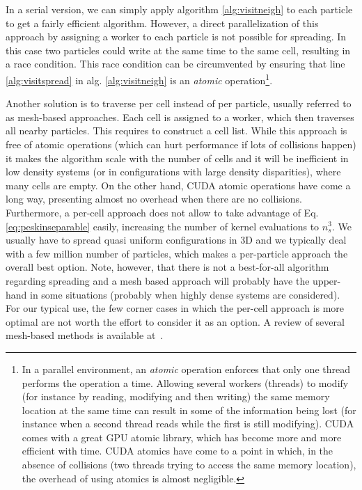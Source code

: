 \documentclass[twoside,openright,titlepage,numbers=noenddot,%
headinclude,footinclude,cleardoublepage=empty,abstract=on,
BCOR=5mm,fontsize=11pt, dvipsnames, paper=b5
]{scrreprt}
\begin{document}
In a serial version, we can simply apply algorithm \ref{alg:visitneigh} to each particle to get a fairly efficient algorithm. However, a direct parallelization of this approach by assigning a worker to each particle is not possible for spreading. In this case two particles could write at the same time to the same cell, resulting in a race condition. This race condition can be circumvented by ensuring that line \ref{alg:visitspread} in alg. \ref{alg:visitneigh} is an \emph{atomic} operation\footnote{In a parallel environment, an \emph{atomic} operation enforces that only one thread performs the operation a time. Allowing several workers (threads) to modify (for instance by reading, modifying and then writing) the same memory location at the same time can result in some of the information being lost (for instance when a second thread reads while the first is still modifying). CUDA comes with a great GPU atomic library, which has become more and more efficient with time. CUDA atomics have come to a point in which, in the absence of collisions (two threads trying to access the same memory location), the overhead of using atomics is almost negligible.}.

Another solution is to traverse per cell instead of per particle, usually referred to as mesh-based approaches. Each cell is assigned to a worker, which then traverses all nearby particles. This requires to construct a cell list. While this approach is free of atomic operations (which can hurt performance if lots of collisions happen) it makes the algorithm scale with the number of cells and it will be inefficient in low density systems (or in configurations with large density disparities), where many cells are empty. On the other hand, CUDA atomic operations have come a long way, presenting almost no overhead when there are no collisions. Furthermore, a per-cell approach does not allow to take advantage of Eq. \eqref{eq:peskinseparable} easily, increasing the number of kernel evaluations to $n_s^3$.
We usually have to spread quasi uniform configurations in 3D and we typically deal with a few million number of particles, which makes a per-particle approach the overall best option. Note, however, that there is not a best-for-all algorithm regarding spreading and a mesh based approach will probably have the upper-hand in some situations (probably when highly dense systems are considered).
For our typical use, the few corner cases in which the per-cell approach is more optimal are not worth the effort to consider it as an option. A review of several mesh-based methods is available at~\cite{Guo2015}.
\end{document}
